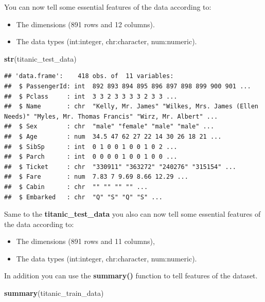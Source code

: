 \documentclass[
]{article}
\newenvironment{Shaded}{\begin{snugshade}}{\end{snugshade}}
\newcommand{\FunctionTok}[1]{\textcolor[rgb]{0.13,0.29,0.53}{\textbf{#1}}}
\newcommand{\NormalTok}[1]{#1}
\providecommand{\tightlist}{%
  \setlength{\itemsep}{0pt}\setlength{\parskip}{0pt}}
\begin{document}
You can now tell some essential features of the data according to:

\begin{itemize}
\tightlist
\item
  The dimensions (891 rows and 12 columns).
\item
  The data types (int:integer, chr:character, num:numeric).
\end{itemize}

\begin{Shaded}
\begin{Highlighting}[]
\FunctionTok{str}\NormalTok{(titanic\_test\_data)}
\end{Highlighting}
\end{Shaded}

\begin{verbatim}
## 'data.frame':    418 obs. of  11 variables:
##  $ PassengerId: int  892 893 894 895 896 897 898 899 900 901 ...
##  $ Pclass     : int  3 3 2 3 3 3 3 2 3 3 ...
##  $ Name       : chr  "Kelly, Mr. James" "Wilkes, Mrs. James (Ellen Needs)" "Myles, Mr. Thomas Francis" "Wirz, Mr. Albert" ...
##  $ Sex        : chr  "male" "female" "male" "male" ...
##  $ Age        : num  34.5 47 62 27 22 14 30 26 18 21 ...
##  $ SibSp      : int  0 1 0 0 1 0 0 1 0 2 ...
##  $ Parch      : int  0 0 0 0 1 0 0 1 0 0 ...
##  $ Ticket     : chr  "330911" "363272" "240276" "315154" ...
##  $ Fare       : num  7.83 7 9.69 8.66 12.29 ...
##  $ Cabin      : chr  "" "" "" "" ...
##  $ Embarked   : chr  "Q" "S" "Q" "S" ...
\end{verbatim}

Same to the \textbf{titanic\_test\_data} you also can now tell some
essential features of the data according to:

\begin{itemize}
\tightlist
\item
  The dimensions (891 rows and 11 columns),
\item
  The data types (int:integer, chr:character, num:numeric).
\end{itemize}

In addition you can use the \textbf{summary()} function to tell features
of the dataset.

\begin{Shaded}
\begin{Highlighting}[]
\FunctionTok{summary}\NormalTok{(titanic\_train\_data)}
\end{Highlighting}
\end{Shaded}
\end{document}
